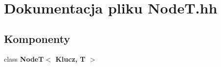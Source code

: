 \section{Dokumentacja pliku Node\-T.\-hh}
\label{_node_t_8hh}
\subsection*{Komponenty}
\begin{DoxyCompactItemize}
\item 
class {\bf Node\-T$<$ Klucz, T $>$}
\end{DoxyCompactItemize}
